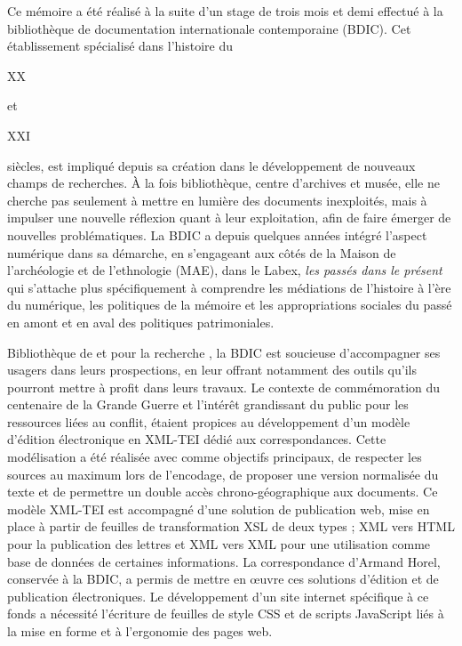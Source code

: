 \documentclass[12pt,a4paper]{book} %
\begin{document}
Ce mémoire a été réalisé à la suite d'un stage de trois mois et demi effectué à la bibliothèque de documentation internationale contemporaine (BDIC). Cet établissement spécialisé dans l'histoire du \begin{scriptsize}XX\end{scriptsize}\ieme{} et \begin{scriptsize}XXI\end{scriptsize}\ieme{} siècles, est impliqué depuis sa création dans le développement de nouveaux champs de recherches. À la fois bibliothèque, centre d'archives et musée, elle ne cherche pas seulement à mettre en lumière des documents inexploités, mais à impulser une nouvelle réflexion quant à leur exploitation, afin de faire émerger de nouvelles problématiques. La BDIC a depuis quelques années intégré l'aspect numérique dans sa démarche, en s'engageant aux côtés de la Maison de l'archéologie et de l'ethnologie (MAE), dans le Labex, \textit{les passés dans le présent} qui s'\og attache plus spécifiquement à comprendre les médiations de l'histoire à l'ère du numérique, les politiques de la mémoire et les appropriations sociales du passé en amont et en aval des politiques patrimoniales\fg{}.

\og Bibliothèque de et pour la recherche \fg{}, la BDIC est soucieuse d'accompagner ses usagers dans leurs prospections, en leur offrant notamment des outils qu'ils pourront mettre à profit dans leurs travaux. Le contexte de commémoration du centenaire de la Grande Guerre et l'intérêt grandissant du public pour les ressources liées au conflit, étaient propices au développement d'un modèle d'édition électronique en XML-TEI dédié aux correspondances. Cette modélisation a été réalisée avec comme objectifs principaux, de respecter les \og sources \fg{} au maximum lors de l'encodage, de proposer une version normalisée du texte et de permettre un double accès chrono-géographique aux documents. Ce modèle XML-TEI est accompagné d'une solution de publication web, mise en place à partir de feuilles de transformation XSL de deux types ; XML vers HTML pour la publication des lettres et XML vers XML pour une utilisation comme base de données de certaines informations. La correspondance d'Armand Horel, conservée à la BDIC, a permis de mettre en œuvre ces solutions d'édition et de publication électroniques. Le développement d'un site internet spécifique à ce fonds a nécessité l'écriture de feuilles de style CSS et de scripts JavaScript liés à la mise en forme et à l'ergonomie des pages web. 
\end{document}

